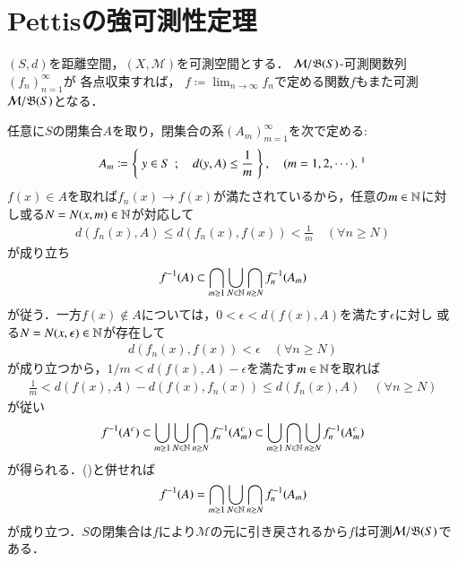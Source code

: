 \section{Pettisの強可測性定理}
	\begin{screen}
		\begin{lem}[距離空間値の可測関数列の各点極限は可測]
			$(S,d)$を距離空間，$(X,\mathcal{M})$を可測空間とする．
			$\mathcal{M}/\mathfrak{B}(S)$-可測関数列$(f_n)_{n=1}^{\infty}$が
			各点収束すれば，
			$f \coloneqq \lim_{n \to \infty} f_n$で定める関数$f$もまた可測$\mathcal{M}/\mathfrak{B}(S)$となる．
			\label{lem:measurability_metric_space}
		\end{lem}
	\end{screen}
	
	\begin{prf}
		任意に$S$の閉集合$A$を取り，閉集合の系$(A_m)_{m=1}^{\infty}$を次で定める:
		\begin{align}
			A_m \coloneqq \Set{y \in S}{d(y,A) \leq \frac{1}{m}}, \quad (m=1,2,\cdots).\ \footnotemark
		\end{align}
		\footnotetext{
			$S \ni y \longmapsto d(y,A) \in [0,\infty)$は連続であるから，
			閉集合$[0,1/m]$は$S$の閉集合に引き戻される．
		}
		$f(x) \in A$を取れば$f_n(x) \longrightarrow f(x)$が満たされているから，任意の$m \in \mathbb{N}$に対し或る$N = N(x,m) \in \mathbb{N}$が対応して
		\begin{align}
			d\left( f_n(x),A \right) \leq d\left( f_n(x),f(x) \right) < \frac{1}{m}
			\quad (\forall n \geq N)
		\end{align}
		が成り立ち
		\begin{align}
			f^{-1}(A) \subset \bigcap_{m \geq 1} \bigcup_{N \in \mathbb{N}} \bigcap_{n \geq N} f_n^{-1}(A_m)
			\label{eq:lem_measurability_metric_space}
		\end{align}
		が従う．一方$f(x) \notin A$については，$0 < \epsilon < d(f(x),A)$を満たす$\epsilon$に対し
		或る$N = N(x,\epsilon) \in \mathbb{N}$が存在して
		\begin{align}
			d\left( f_n(x), f(x) \right) < \epsilon
			\quad (\forall n \geq N)
		\end{align}
		が成り立つから，$1/m < d(f(x),A) - \epsilon$を満たす$m \in \mathbb{N}$を取れば
		\begin{align}
			\frac{1}{m} < d(f(x),A) - d(f(x),f_n(x)) \leq d(f_n(x),A)
			\quad (\forall n \geq N)
		\end{align}
		が従い
		\begin{align}
			f^{-1}(A^c) \subset \bigcup_{m \geq 1} \bigcup_{N \in \mathbb{N}} \bigcap_{n \geq N} f_n^{-1}(A_m^c)
			\subset \bigcup_{m \geq 1} \bigcap_{N \in \mathbb{N}} \bigcup_{n \geq N} f_n^{-1}(A_m^c)
		\end{align}
		が得られる．()と併せれば
		\begin{align}
			f^{-1}(A) = \bigcap_{m \geq 1} \bigcup_{N \in \mathbb{N}} \bigcap_{n \geq N} f_n^{-1}(A_m)
		\end{align}
		が成り立つ．$S$の閉集合は$f$により$\mathcal{M}$の元に引き戻されるから$f$は可測$\mathcal{M}/\mathfrak{B}(S)$である．
		\QED
	\end{prf}